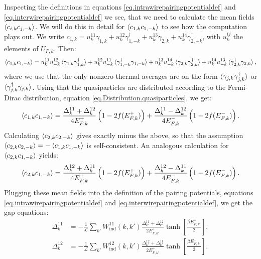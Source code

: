 Inspecting the definitions in equations \eqref{eq.intrawirepairingpotentialdef} and \eqref{eq.interwirepairingpotentialdef} we see, that we need to calculate the mean fields $\braket{ c_{i, k} c_{j,-k} }$. We will do this in detail for $\braket{c_{1,k}c_{1,-k}}$ to see how the computation plays out. We write $c_{1,k} = u^{11}_{k} \gamma_{1,k} + u^{12}_{k} \gamma^\dagger_{1,-k} + u^{13}_{k} \gamma_{2,k} + u^{14}_{k} \gamma^\dagger_{2,-k}$, with $u^{ij}_k$ the elements of $U_{F,k}$. Then:
\begin{equation}
\braket{c_{1,k}c_{1,-k}} = u^{11}_{k}u^{12}_{-k}\braket{\gamma_{1,k}\gamma^\dagger_{1,k}} + u^{12}_{k}u^{11}_{-k}\braket{\gamma^\dagger_{1,-k}\gamma_{1,-k}} + u^{13}_{k}u^{14}_{-k}\braket{\gamma_{2,k}\gamma^\dagger_{2,k}} + u^{14}_{k}u^{13}_{-k}\braket{\gamma^\dagger_{2,k}\gamma_{2,k}}, \nonumber
\end{equation}
where we use that the only nonzero thermal averages are on the form $\braket{\gamma_{j,k}\gamma^\dagger_{j,k}}$ or $\braket{\gamma^\dagger_{j,k}\gamma_{j,k}}$. Using that the quasiparticles are distributed according to the Fermi-Dirac distribution, equation \eqref{eq.Distribution.quasiparticles}, we get:
\begin{equation}
\braket{c_{1,k}c_{1,-k}} = \frac{\Delta^{11}_k + \Delta^{12}_k}{4E^{+}_{F,k}}\left(1 - 2f(E^{+}_{F,k})\right) + \frac{\Delta^{11}_k - \Delta^{12}_k}{4E^{-}_{F,k}}\left(1 - 2f(E^{-}_{F,k})\right). 
\label{eq.meanfield11}
\end{equation}
Calculating $\braket{c_{2,k}c_{2,-k}}$ gives exactly minus the above, so that the assumption $\braket{c_{2,k}c_{2,-k}} = -\braket{c_{1,k}c_{1,-k}}$ is self-consistent. An analogous calculation for $\braket{c_{2,k}c_{1,-k}}$ yields:
\begin{equation}
\braket{c_{2,k}c_{1,-k}} = \frac{\Delta^{12}_k + \Delta^{11}_k}{4E^{+}_{F,k}}\left(1 - 2f(E^{+}_{F,k})\right) + \frac{\Delta^{12}_k - \Delta^{11}_k}{4E^{-}_{F,k}}\left(1 - 2f(E^{-}_{F,k})\right). 
\label{eq.meanfield12}
\end{equation}
Plugging these mean fields into the definition of the pairing potentials, equations \eqref{eq.intrawirepairingpotentialdef} and \eqref{eq.interwirepairingpotentialdef}, we get the gap equations:
\begin{align}
\Delta^{11}_k &= -\frac{1}{\mathcal{L}}\sum_{k'} W_{\text{ind}}^{11}(k, k')\frac{\Delta^{11}_{k'} + \Delta^{12}_{k'}}{2E^{+}_{F,k'}}\tanh\left[\frac{\beta E^{+}_{F,k'}}{2}\right], \nonumber \\
\Delta^{12}_k &= -\frac{1}{\mathcal{L}}\sum_{k'} W_{\text{ind}}^{12}(k, k')\frac{\Delta^{12}_{k'} + \Delta^{11}_{k'}}{2E^{+}_{F,k'}}\tanh\left[\frac{\beta E^{+}_{F,k'}}{2}\right].
\label{eq.2wiresgapequations}
\end{align}
